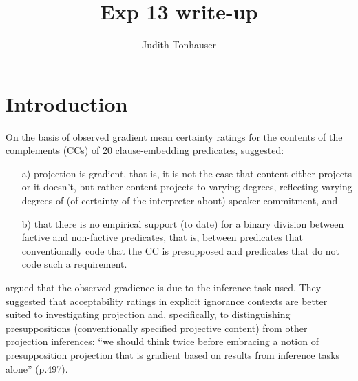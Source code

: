\documentclass[11pt,fleqn]{article}
\title{Exp 13 write-up}
\author{Judith Tonhauser}
\newcommand{\6}{\mbox{$[\hspace*{-.6mm}[$}}
\newcommand{\9}{\mbox{$]\hspace*{-.6mm}]$}}
\begin{document}
\maketitle

\vspace*{-1cm}

\section{Introduction}\label{s-intro}

On the basis of observed gradient mean certainty ratings for the contents of the complements (CCs) of 20 clause-embedding predicates, \citealt{degen-tonhauser-openmind,degen-tonhauser-language} suggested:

\begin{itemize}
\item[a)] projection is gradient, that is, it is not the case that content either projects or it doesn't, but rather content projects to varying degrees, reflecting varying degrees of (of certainty of the interpreter about) speaker commitment, and

\item[b)] that there is no empirical support (to date) for a binary division between factive and non-factive predicates, that is, between predicates that conventionally code that the CC is presupposed and predicates that do not code such a requirement.
\end{itemize}

 \citealt[\S6.2]{mandelkern-etal2020} argued that the observed gradience is due to the inference task used. They suggested that acceptability ratings in explicit ignorance contexts are better suited to investigating projection and, specifically, to distinguishing presuppositions (conventionally specified projective content) from other projection inferences: ``we should think twice before embracing a notion of presupposition projection that is gradient based on results from inference tasks alone'' (p.497). 
\end{document}
